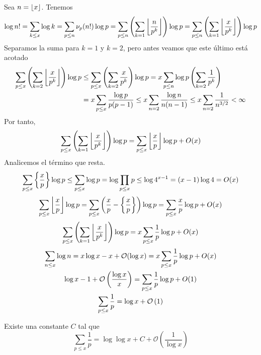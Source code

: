 \documentclass[TAN.tex]{subfiles}
\begin{document}
\begin{dem}
Sea $n=\left\lfloor{x}\right\rfloor$. Tenemos
$$
\log n! = \sum_{k\leq x} \log k = \sum_{p\leq n}\nu_p(n!)\log p = \sum_{p\leq n}\left(\sum_{k=1}\left\lfloor{\frac{n}{p^k}}\right\rfloor\right)\log p
=  \sum_{p\leq n}\left(\sum_{k=1}\left\lfloor{\frac{x}{p^k}}\right\rfloor\right)\log p$$
Separamos la suma para $k=1$ y $k=2$, pero antes veamos que este último está acotado
\begin{align*}
\sum_{p\leq x}\left(\sum_{k=2}\left\lfloor{\frac{x}{p^k}}\right\rfloor\right)\log p &\leq \sum_{p\leq x}\left(\sum_{k=2}\frac{x}{p^k}\right)\log p = x\sum_{p\leq n}\log p\left(\sum_{k=2}\frac{1}{p^k}\right)\\
&= x\sum_{p\leq x} \frac{\log p }{p(p-1)} \leq x\sum_{n=2} \frac{\log n}{n(n-1)}\leq x \sum_{n=2}\frac{1}{n^{3/2}}<\infty
\end{align*}
Por tanto,
$$
\sum_{p\leq x}\left(\sum_{k=1}\left\lfloor{\frac{x}{p^k}}\right\rfloor\right)\log p = \sum_{p\leq x}\left\lfloor{\frac{x}{p}}\right\rfloor\log p+O(x)
$$
Analicemos el término que resta.
$$
\sum_{p\leq x}\left\{{\frac{x}{p}}\right\}\log p \leq \sum_{p\leq x}\log p = \log \prod_{p\leq x} p \leq \log 4^{x-1} =(x-1)\log 4 = O(x)
$$
\begin{align*}
\sum_{p\leq x}\left\lfloor{\frac{x}{p}}\right\rfloor\log p = \sum_{p\leq x}\left(\frac{x}{p}-\left\{{\frac{x}{p}}\right\}\right)\log p = \sum_{p\leq x}{\frac{x}{p}}\log p + O(x) 
\end{align*}
$$
\sum_{p\leq x}\left(\sum_{k=1}\left\lfloor{\frac{x}{p^k}}\right\rfloor\right)\log p = x\sum_{p\leq x}\frac{1}{p}\log p+O(x)
$$
\begin{gather*}
\sum_{n\leq x}\log n = x\log x -x+ \mathcal{O}(\log x)  = x\sum_{p\leq x}\frac{1}{p}\log p+O(x)\\
 \log x -1+ \mathcal{O}\left({\frac{\log x}{x}}\right)  = \sum_{p\leq x}\frac{1}{p}\log p+O(1)\\
 \sum_{p\leq x}\frac{1}{p} = \log x + \mathcal{O}\left({1}\right)
\end{gather*}
\end{dem}
\begin{teorema}[Mertens]
Existe una constante $C$ tal que
\[ \sum_{p≤x} \frac{1}{p} = \log \log x + C + \mathcal{O}\left(\frac{1}{\log x}\right) \]
\end{teorema}
\end{document}
